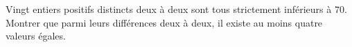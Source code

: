 Vingt entiers positifs distincts deux à deux sont tous strictement inférieurs
à $70$. Montrer que parmi leurs différences deux à deux, il existe au moins
quatre valeurs égales.
